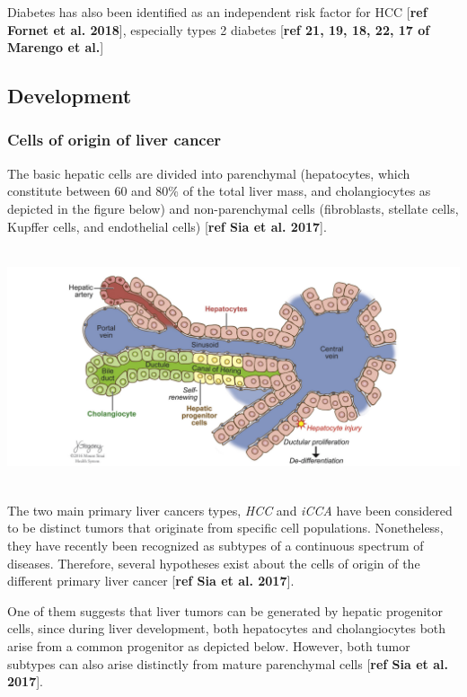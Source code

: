 \documentclass[]{article}
\begin{document}
Diabetes has also been identified as an independent risk factor for HCC
{[}\textbf{ref Fornet et al. 2018}{]}, especially types 2 diabetes
{[}\textbf{ref 21, 19, 18, 22, 17 of Marengo et al.}{]}

\subsection{Development}\label{development}

\subsubsection{Cells of origin of liver
cancer}\label{cells-of-origin-of-liver-cancer}

The basic hepatic cells are divided into parenchymal (hepatocytes, which
constitute between 60 and 80\% of the total liver mass, and
cholangiocytes as depicted in the figure below) and non-parenchymal
cells (fibroblasts, stellate cells, Kupffer cells, and endothelial
cells) {[}\textbf{ref Sia et al. 2017}{]}.

\includegraphics[width=6.26772in,height=2.75000in]{./images/media/image7.png}

The two main primary liver cancers types, \emph{HCC} and \emph{iCCA}
have been considered to be distinct tumors that originate from specific
cell populations. Nonetheless, they have recently been recognized as
subtypes of a continuous spectrum of diseases. Therefore, several
hypotheses exist about the cells of origin of the different primary
liver cancer {[}\textbf{ref Sia et al. 2017}{]}.

One of them suggests that liver tumors can be generated by hepatic
progenitor cells, since during liver development, both hepatocytes and
cholangiocytes both arise from a common progenitor as depicted below.
However, both tumor subtypes can also arise distinctly from mature
parenchymal cells {[}\textbf{ref Sia et al. 2017}{]}.
\end{document}
